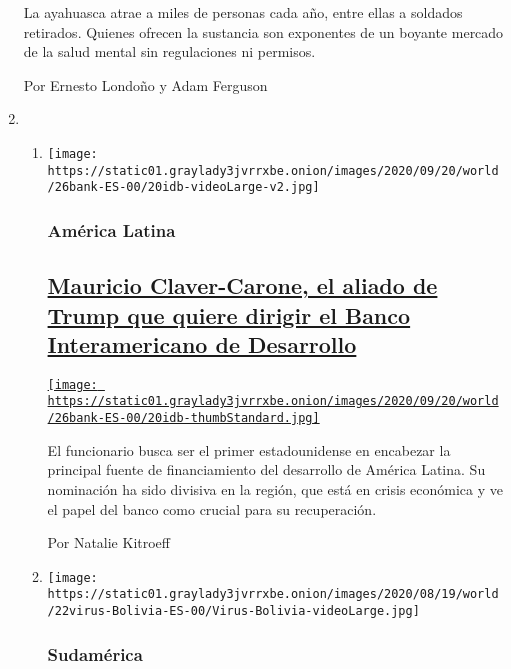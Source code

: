 \begin{enumerate}
  La ayahuasca atrae a miles de personas cada año, entre ellas a
  soldados retirados. Quienes ofrecen la sustancia son exponentes de un
  boyante mercado de la salud mental sin regulaciones ni permisos.

  Por Ernesto Londoño y Adam Ferguson
\item
  \begin{enumerate}
  \def\labelenumii{\arabic{enumii}.}
  \item
    \texttt{[image: https://static01.graylady3jvrrxbe.onion/images/2020/09/20/world/26bank-ES-00/20idb-videoLarge-v2.jpg]}

    \hypertarget{amuxe9rica-latina-1}{%
    \subsubsection{América Latina}\label{amuxe9rica-latina-1}}

    \hypertarget{mauricio-claver-carone-el-aliado-de-trump-que-quiere-dirigir-el-banco-interamericano-de-desarrollo}{%
    \subsection{\texorpdfstring{\href{/es/2020/08/26/espanol/america-latina/mauricio-claver-carone-bid-trump.html}{Mauricio
    Claver-Carone, el aliado de Trump que quiere dirigir el Banco
    Interamericano de
    Desarrollo}}{Mauricio Claver-Carone, el aliado de Trump que quiere dirigir el Banco Interamericano de Desarrollo}}\label{mauricio-claver-carone-el-aliado-de-trump-que-quiere-dirigir-el-banco-interamericano-de-desarrollo}}

    \href{/es/2020/08/26/espanol/america-latina/mauricio-claver-carone-bid-trump.html}{\texttt{[image: https://static01.graylady3jvrrxbe.onion/images/2020/09/20/world/26bank-ES-00/20idb-thumbStandard.jpg]}}

    El funcionario busca ser el primer estadounidense en encabezar la
    principal fuente de financiamiento del desarrollo de América Latina.
    Su nominación ha sido divisiva en la región, que está en crisis
    económica y ve el papel del banco como crucial para su recuperación.

    Por Natalie Kitroeff
  \item
    \texttt{[image: https://static01.graylady3jvrrxbe.onion/images/2020/08/19/world/22virus-Bolivia-ES-00/Virus-Bolivia-videoLarge.jpg]}

    \hypertarget{sudamuxe9rica}{%
    \subsubsection{Sudamérica}\label{sudamuxe9rica}}


\end{enumerate}
\end{enumerate}
